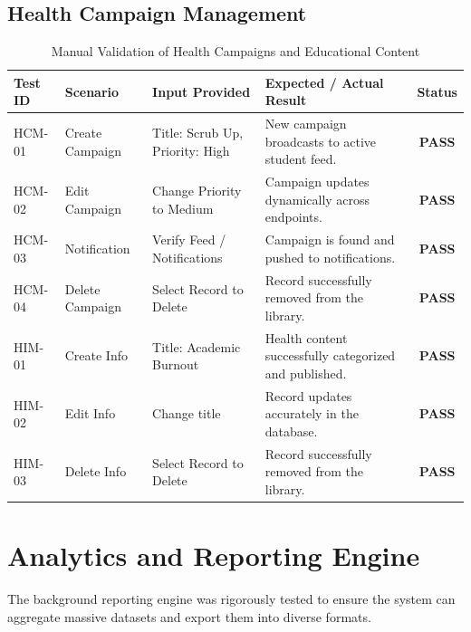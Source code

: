 \subsection{Health Campaign Management}
\begin{table}[H]
\centering
\caption{Manual Validation of Health Campaigns and Educational Content}
\begin{tabularx}{\textwidth}{|l|Y|Y|Y|c|}
\hline
\textbf{Test ID} & \textbf{Scenario} & \textbf{Input Provided} & \textbf{Expected / Actual Result} & \textbf{Status} \\
\hline
HCM-01 & Create Campaign & Title: Scrub Up, Priority: High & New campaign broadcasts to active student feed. & \textbf{PASS} \\
\hline
HCM-02 & Edit Campaign & Change Priority to Medium & Campaign updates dynamically across endpoints. & \textbf{PASS} \\
\hline
HCM-03 & Notification & Verify Feed / Notifications & Campaign is found and pushed to notifications. & \textbf{PASS} \\
\hline
HCM-04 & Delete Campaign & Select Record to Delete & Record successfully removed from the library. & \textbf{PASS} \\
\hline
HIM-01 & Create Info & Title: Academic Burnout & Health content successfully categorized and published. & \textbf{PASS} \\
\hline
HIM-02 & Edit Info & Change title & Record updates accurately in the database. & \textbf{PASS} \\
\hline
HIM-03 & Delete Info & Select Record to Delete & Record successfully removed from the library. & \textbf{PASS} \\
\hline
\end{tabularx}
\end{table}

\section{Analytics and Reporting Engine}
The background reporting engine was rigorously tested to ensure the system can aggregate massive datasets and export them into diverse formats.

